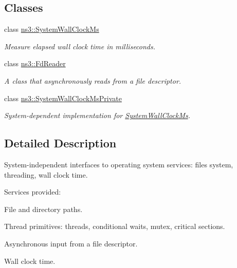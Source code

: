 \subsection*{Classes}
\begin{DoxyCompactItemize}
\item 
class \hyperlink{classns3_1_1SystemWallClockMs}{ns3\+::\+System\+Wall\+Clock\+Ms}
\begin{DoxyCompactList}\small\item\em Measure elapsed wall clock time in milliseconds. \end{DoxyCompactList}\item 
class \hyperlink{classns3_1_1FdReader}{ns3\+::\+Fd\+Reader}
\begin{DoxyCompactList}\small\item\em A class that asynchronously reads from a file descriptor. \end{DoxyCompactList}\item 
class \hyperlink{classns3_1_1SystemWallClockMsPrivate}{ns3\+::\+System\+Wall\+Clock\+Ms\+Private}
\begin{DoxyCompactList}\small\item\em System-\/dependent implementation for \hyperlink{classns3_1_1SystemWallClockMs}{System\+Wall\+Clock\+Ms}. \end{DoxyCompactList}\end{DoxyCompactItemize}


\subsection{Detailed Description}
System-\/independent interfaces to operating system services\+: files system, threading, wall clock time.

Services provided\+:


\begin{DoxyItemize}
\item File and directory paths.
\item Thread primitives\+: threads, conditional waits, mutex, critical sections.
\item Asynchronous input from a file descriptor.
\item Wall clock time. 
\end{DoxyItemize}